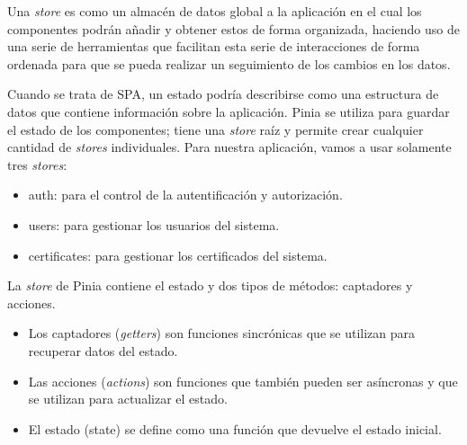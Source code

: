 Una \textit{store} es como un almacén de datos global a la aplicación en el cual los componentes podrán añadir y obtener estos de forma organizada, haciendo uso de una serie de herramientas que facilitan esta serie de interacciones de forma ordenada para que se pueda realizar un seguimiento de los cambios en los datos.

Cuando se trata de SPA, un estado podría describirse como una estructura de datos que contiene información sobre la aplicación. Pinia se utiliza para guardar el estado de los componentes; tiene una \textit{store} raíz y permite crear cualquier cantidad de \textit{stores} individuales. Para nuestra aplicación, vamos a usar solamente tres \textit{stores}:

\begin{itemize}
\item auth: para el control de la autentificación y autorización.
\item users: para gestionar los usuarios del sistema.
\item certificates: para gestionar los certificados del sistema.
\end{itemize}

La \textit{store} de Pinia contiene el estado y dos tipos de métodos: captadores y acciones.
\begin{itemize}
\item Los captadores (\textit{getters}) son funciones sincrónicas que se utilizan para recuperar datos del estado.
\item Las acciones (\textit{actions}) son funciones que también pueden ser asíncronas y que se utilizan para actualizar el estado.
\item El estado (state) se define como una función que devuelve el estado inicial.
\end{itemize}


